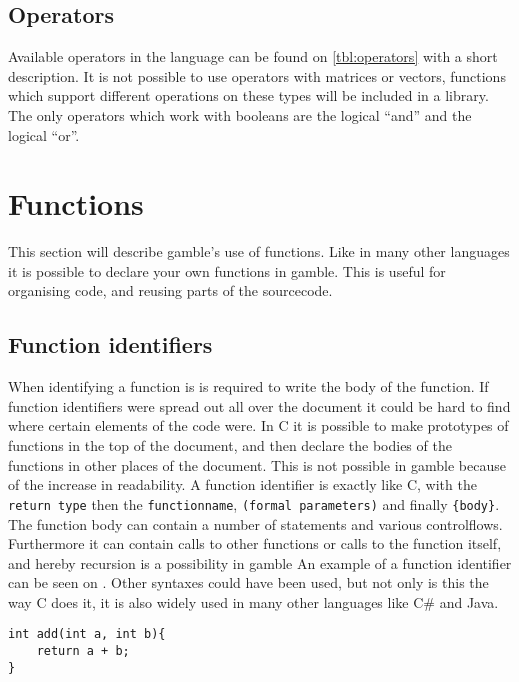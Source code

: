 \subsection*{Operators}
Available operators in the language can be found on \ref{tbl:operators} with a short description.  
It is not possible to use operators with matrices or vectors, functions which support different operations on these types will be included in a library.
The only operators which work with booleans are the logical ``and'' and the logical ``or''. 


\section{Functions}
This section will describe \gls{gamble}'s use of functions. 
Like in many other languages it is possible to declare your own functions in \gls{gamble}.
This is useful for organising code, and reusing parts of the sourcecode.

\subsection*{Function identifiers}
When identifying a function is is required to write the body of the function.
If function identifiers were spread out all over the document it could be hard to find where certain elements of the code were.
In C it is possible to make prototypes of functions in the top of the document, and then declare the bodies of the functions in other places of the document. 
This is not possible in \gls{gamble} because of the increase in readability.
A function identifier is exactly like C, with the \texttt{return type} then the \texttt{functionname}, \texttt{(formal parameters)} and finally \texttt{\{body\}}.
The function body can contain a number of statements and various controlflows.
Furthermore it can contain calls to other functions or calls to the function itself, and hereby recursion is a possibility in \gls{gamble}
An example of a function identifier can be seen on .
Other syntaxes could have been used, but not only is this the way C does it, it is also widely used in many other languages like C\# and Java.


\begin{lstlisting}[caption={Function Idemtifier},label={lst:functionID}]                                                        
int add(int a, int b){
	return a + b;
}
\end{lstlisting}

